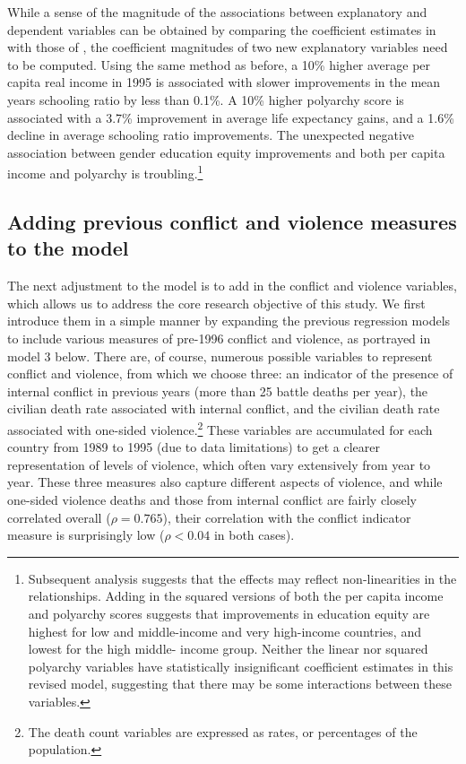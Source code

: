 \documentclass[12pt]{article}
\begin{document}
While a sense of the magnitude of the associations between explanatory and dependent variables can be obtained by comparing the coefficient estimates in  with those of , the coefficient magnitudes of two new explanatory variables need to be computed. Using the same method as before, a 10\% higher average per capita real income in 1995 is associated with slower improvements in the mean years schooling ratio by less than 0.1\%. A 10\% higher polyarchy score is associated with a 3.7\% improvement in average life expectancy gains, and a 1.6\% decline in average schooling ratio improvements.  The unexpected negative association between gender education equity improvements and both per capita income and polyarchy is troubling.\footnote{
Subsequent analysis suggests that the effects may reflect non-linearities in the relationships. Adding in the squared versions of both the per capita income and polyarchy scores suggests that improvements in education equity are highest for low and middle-income and very high-income countries, and lowest for the high middle- income group.  Neither the linear nor squared polyarchy variables have statistically insignificant coefficient estimates in this revised model, suggesting that there may be some interactions between these variables.}

\subsection{Adding previous conflict and violence measures to the model}

The next adjustment to the model is to add in the conflict and violence variables, which allows us to address the core research objective of this study. We first introduce them in a simple manner by expanding the previous regression models to include various measures of pre-1996 conflict and violence, as portrayed in model 3 below. There are, of course, numerous possible variables to represent conflict and violence, from which we choose three: an indicator of the presence of internal conflict in previous years (more than 25 battle deaths per year), the civilian death rate associated with internal conflict, and the civilian death rate associated with one-sided violence.\footnote{
The death count variables are expressed as rates, or percentages of the population.}
These variables are accumulated for each country from 1989 to 1995 (due to data limitations) to get a clearer representation of levels of violence, which often vary extensively from year to year. These three measures also capture different aspects of violence, and while one-sided violence deaths and those from internal conflict are fairly closely correlated overall ($\rho = 0.765$), their correlation with the conflict indicator measure is surprisingly low ($\rho <  0.04$ in both cases).
\end{document}

